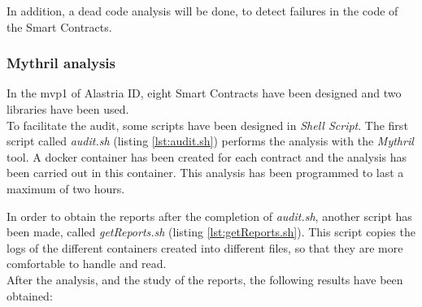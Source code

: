 \documentclass[a4paper, 12pt]{article} %
\begin{document}
        In addition, a dead code analysis will be done, to detect failures in the code of the Smart Contracts.
        
        \subsubsection{Mythril analysis}
            In the \acrshort{mvp}1 of Alastria ID, eight Smart Contracts have been designed and two libraries have been used.\\
            
            To facilitate the audit, some scripts have been designed in \textit{Shell Script}. The first script called \textit{audit.sh} (listing \ref{lst:audit.sh}) performs the analysis with the \textit{Mythril} tool. A docker container has been created for each contract and the analysis has been carried out in this container. This analysis has been programmed to last a maximum of two hours.
        
            
        
            In order to obtain the reports after the completion of \textit{audit.sh}, another script has been made, called \textit{getReports.sh} (listing \ref{lst:getReports.sh}). This script copies the logs of the different containers created into different files, so that they are more comfortable to handle and read.\\
            
            
            
            After the analysis, and the study of the reports, the following results have been obtained:
\end{document}
